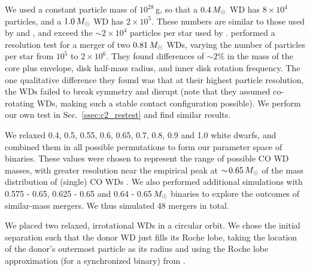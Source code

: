 We used a constant particle mass of $10^{28}\,$g, so that a $0.4\,\Msun$ WD has $8\times10^4$ particles, and a $1.0\,\Msun$ WD has $2\times10^5$.  These numbers are similar to those used by  and \cite{yoonpr07}, and exceed the $\sim2\times10^4$ particles per star used by \cite{dan+12}. \cite{rask+12} performed a resolution test for a merger of two $0.81\,\Msun$ WDs, varying the number of particles per star from $10^5$ to $2\times10^6$.  They found differences of $\sim\!2\%$ in the mass of the core plus envelope, disk half-mass radius, and inner disk rotation frequency.  The one qualitative difference they found was that at their highest particle resolution, the WDs failed to break symmetry and disrupt (note that they assumed co-rotating WDs, making such a stable contact configuration possible).  We perform our own test in Sec.~\ref{ssec:c2_restest} and find similar results.

We relaxed 0.4, 0.5, 0.55, 0.6, 0.65, 0.7, 0.8, 0.9 and 1.0 {\Msun} white dwarfs, and combined them in all possible permutations to form our parameter space of binaries.  These values were chosen to represent the range of possible CO WD masses, with greater resolution near the empirical peak at $\sim\!0.65\,\Msun$ of the mass distribution of (single) CO WDs \citep{tremb09}.  We also performed additional simulations with 0.575 - 0.65, 0.625 - 0.65 and 0.64 - 0.65$\,\Msun$ binaries to explore the outcomes of similar-mass mergers.  We thus simulated 48 mergers in total.

We placed two relaxed, irrotational WDs in a circular orbit.  We chose the initial separation {\azero} such that the donor WD just fills its Roche lobe, taking the location of the donor's outermost particle as its radius and using the Roche lobe approximation (for a synchronized binary) from \citet{eggl83}.  

